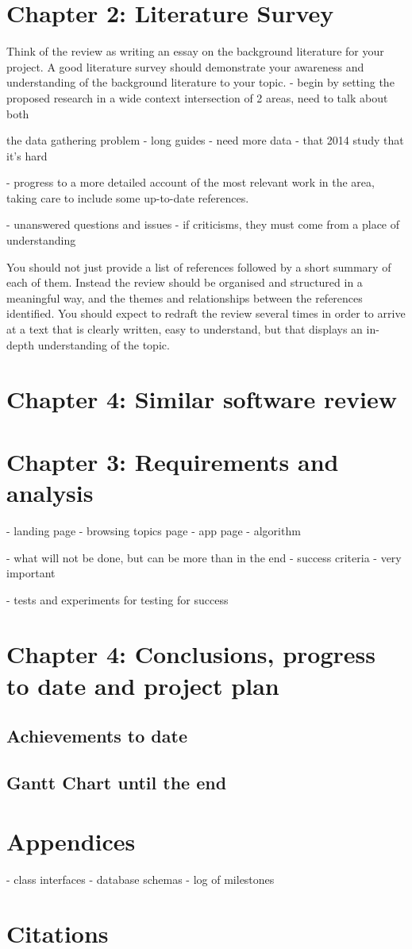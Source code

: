 \documentclass{article}
\begin{document}
\section{Chapter 2: Literature Survey}
Think of the review as writing an essay on the background literature for your project. 
A good literature survey should demonstrate your awareness and understanding of the background literature to your topic. 
- begin by setting the proposed research in a wide context
intersection of 2 areas, need to talk about both


the data gathering problem
- long guides
- need more data
- that 2014 study that it's hard


- progress to a more detailed account of the most relevant work in the area, taking care to include some up-to-date references. 

- unanswered questions and issues
- if criticisms, they must come from a place of understanding

You should not just provide a list of references followed by a short summary of each of them.
Instead the review should be organised and structured in a meaningful way, and the themes and relationships between the references identified. 
You should expect to redraft the review several times in order to arrive at a text that is clearly written, easy to understand, but that displays an in-depth understanding of the topic. 

\section{Chapter 4: Similar software review}


\section{Chapter 3: Requirements and analysis}
- landing page
- browsing topics page
- app page
- algorithm

- what will not be done, but can be more than in the end
- success criteria  - very important

- tests and experiments for testing for success

\section{Chapter 4: Conclusions, progress to date and project plan}

\subsection{Achievements to date}

\subsection{Gantt Chart until the end}

\section{Appendices}
- class interfaces
- database schemas
- log of milestones

\section{Citations}
\newpage
\end{document}

